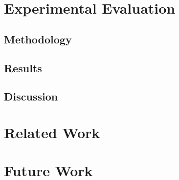 \documentclass[conference]{IEEEtran}
\begin{document}
\section{Experimental Evaluation}
\subsection{Methodology}
\subsection{Results}
\subsection{Discussion}

\section{Related Work}

\section{Future Work}

\end{document}
